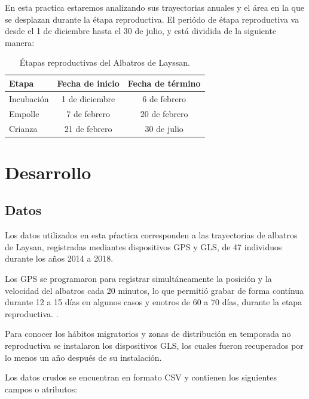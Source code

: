 \documentclass[a4paper, 11pt]{article}
\begin{document}
En esta practica estaremos analizando sus trayectorias anuales y el área en la
que se desplazan durante la étapa reproductiva. El periódo de étapa reproductiva
va desde el 1 de diciembre hasta el 30 de julio, y está dividida de la siguiente
manera:


\begin{table}[h!]
\caption{Étapas reproductivas del Albatros de Layssan.}
\begin{center}
\begin{tabular}{lcc}
    Etapa & Fecha de inicio & Fecha de término \\
    \hline
    Incubación & 1 de diciembre & 6 de febrero \\
    Empolle & 7 de febrero & 20 de febrero \\
    Crianza & 21 de febrero & 30 de julio
\end{tabular}
\end{center}
\end{table}


\section{Desarrollo}

\subsection{Datos}

Los datos utilizados en esta pŕactica corresponden a las trayectorias de
albatros de Laysan, registradas mediantes dispositivos GPS y GLS, de 47
individuos durante los años 2014 a 2018.

Los GPS se programaron para registrar simultáneamente la posición y la velocidad
del albatros cada 20 minutos, lo que permitió grabar de forma contínua durante
12 a 15 días en algunos casos y enotros de 60 a 70 días, durante la etapa
reproductiva. \cite{hernandez2019ecologia}.

Para conocer los hábitos migratorios y zonas de distribución en temporada no
reproductiva se instalaron los dispositivos GLS, los cuales fueron recuperados
por lo menos un año después de su instalación.

Los datos crudos se encuentran en formato CSV y contienen los siguientes campos
o atributos:
\end{document}
